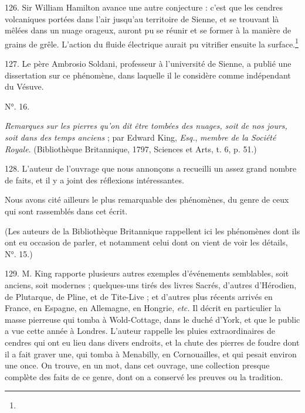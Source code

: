 \documentclass[a4paper, 11pt, oneside, polutonikogreek, french]{article}
\begin{document}
126. Sir William Hamilton avance une autre conjecture : c'est que les cendres volcaniques portées dans l'air jusqu'au territoire de Sienne, et se trouvant là mêlées dans un nuage orageux, auront pu se réunir et se former à la manière de grains de grêle. L'action du fluide électrique aurait pu vitrifier ensuite la surface.\footnote{}

127. Le père Ambrosio Soldani, professeur à l'université de Sienne, a publié une dissertation sur ce phénomène, dans laquelle il le considère comme indépendant du Vésuve.

\begin{center}
N°. 16.
\end{center}

\begin{center}
\emph{Remarques sur les pierres qu'on dit être tombées des nuages, soit de nos jours, soit dans des temps anciens} ; par Edward King, \emph{Esq.}, \emph{membre de la Société Royale}. (Bibliothèque Britannique, 1797, Sciences et Arts, t. 6, p. 51.)
\end{center}

128. L'auteur de l'ouvrage que nous annonçons a recueilli un assez grand nombre de faits, et il y a joint des réflexions intéressantes.

Nous avons cité ailleurs le plus remarquable des phénomènes, du genre de ceux qui sont rassemblés dans cet écrit.

(Les auteurs de la Bibliothèque Britannique rappellent ici les phénomènes dont ils ont eu occasion de parler, et notamment celui dont on vient de voir les détails, N°. 15.)

129. M. King rapporte plusieurs autres exemples d'événements semblables, soit anciens, soit modernes ; quelques-uns tirés des livres Sacrés, d'autres d'Hérodien, de Plutarque, de Pline, et de Tite-Live ; et d'autres plus récents arrivés en France, en Espagne, en Allemagne, en Hongrie, \emph{etc.} Il décrit en particulier la masse pierreuse qui tomba à Wold-Cottage, dans le duché d'York, et que le public a vue cette année à Londres. L'auteur rappelle les pluies extraordinaires de cendres qui ont eu lieu dans divers endroits, et la chute des pierres de foudre dont il a fait graver une, qui tomba à Menabilly, en Cornouailles, et qui pesait environ une once. On trouve, en un mot, dans cet ouvrage, une collection presque complète des faits de ce genre, dont on a conservé les preuves ou la tradition.
\end{document}
